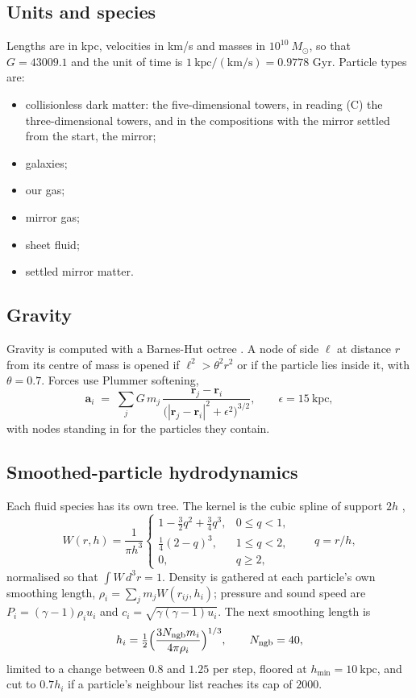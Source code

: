 \documentclass[11pt]{article}
\theoremstyle{definition}
\theoremstyle{plain}
\providecommand{\Msun}{}\renewcommand{\Msun}{M_{\odot}}
\providecommand{\kpc}{}\renewcommand{\kpc}{\mathrm{kpc}}
\begin{document}
\subsection*{Units and species}
\label{c:note.simulations.setting-units-species}
Lengths are in kpc, velocities in km/s and masses in $10^{10}\ \Msun$, so that $G = 43009.1$ and the unit of time is $1\ \kpc/(\mathrm{km/s}) = 0.9778$ Gyr. Particle types are:
\begin{itemize}
\item[$0$] collisionless dark matter: the five-dimensional towers, in reading (C) the three-dimensional towers, and in the compositions with the mirror settled from the start, the mirror;
\item[$1$] galaxies;
\item[$2$] our gas;
\item[$3$] mirror gas;
\item[$4$] sheet fluid;
\item[$5$] settled mirror matter.
\end{itemize}

\subsection*{Gravity}
\label{c:note.simulations.setting-gravity}
Gravity is computed with a Barnes-Hut octree \cite{BarnesHut1986}. A node of side $\ell$ at distance $r$ from its centre of mass is opened if $\ell^{2} > \theta^{2}r^{2}$ or if the particle lies inside it, with $\theta = 0.7$. Forces use Plummer softening,
\[
\mathbf{a}_{i} \;=\; \sum_{j} G\,m_{j}\,\frac{\mathbf{r}_{j} - \mathbf{r}_{i}}{\bigl(|\mathbf{r}_{j} - \mathbf{r}_{i}|^{2} + \epsilon^{2}\bigr)^{3/2}},
\qquad \epsilon = 15\ \kpc ,
\]
with nodes standing in for the particles they contain.

\subsection*{Smoothed-particle hydrodynamics}
\label{c:note.simulations.setting-smoothed-particle-hydrodynamics}
Each fluid species has its own tree. The kernel is the cubic spline of support $2h$ \cite{MonaghanLattanzio1985},
\[
W(r, h) = \frac{1}{\pi h^{3}}
\begin{cases}
1 - \tfrac{3}{2}q^{2} + \tfrac{3}{4}q^{3}, & 0 \le q < 1,\\[2pt]
\tfrac{1}{4}(2 - q)^{3}, & 1 \le q < 2,\\[2pt]
0, & q \ge 2,
\end{cases}
\qquad q = r/h ,
\]
normalised so that $\int W\,d^{3}r = 1$. Density is gathered at each particle's own smoothing length, $\rho_{i} = \sum_{j} m_{j}W(r_{ij}, h_{i})$; pressure and sound speed are $P_{i} = (\gamma - 1)\rho_{i}u_{i}$ and $c_{i} = \sqrt{\gamma(\gamma - 1)u_{i}}$. The next smoothing length is
\[
h_{i} = \tfrac{1}{2}\Bigl(\frac{3N_{\mathrm{ngb}}m_{i}}{4\pi\rho_{i}}\Bigr)^{1/3}, \qquad N_{\mathrm{ngb}} = 40,
\]
limited to a change between $0.8$ and $1.25$ per step, floored at $h_{\min} = 10\ \kpc$, and cut to $0.7h_{i}$ if a particle's neighbour list reaches its cap of $2000$.
\end{document}
